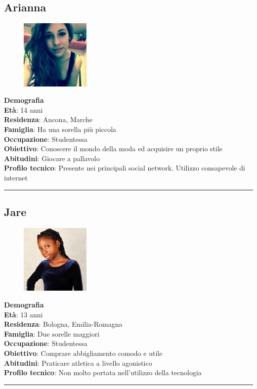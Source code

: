 \documentclass[12pt,a4paper]{report}
\begin{document}
\subsection*{Arianna}
\begin{figure}
  \centering
  \includegraphics[width=0.3\textwidth]{"Images Latex/Personas/Arianna"}
\end{figure}
\textbf{Demografia}\\
\indent\textbf{Età}: 14 anni\\
\indent\textbf{Residenza}: Ancona, Marche\\
\indent\textbf{Famiglia}: Ha una sorella più piccola\\
\indent\textbf{Occupazione}: Studentessa\\
\textbf{Obiettivo}: Conoscere il mondo della moda ed acquisire un proprio stile\\
\textbf{Abitudini}: Giocare a pallavolo\\
\textbf{Profilo tecnico}: Presente nei principali social network. Utilizzo consapevole di internet\\
\rule{\textwidth}{0.5pt}
\subsection*{Jare}
\begin{figure}
  \centering
    \includegraphics[width=0.3\textwidth]{"Images Latex/Personas/Jare"}
\end{figure}
\textbf{Demografia}\\
\indent \textbf{Età}: 13 anni\\
\indent \textbf{Residenza}: Bologna, Emilia-Romagna\\
\indent \textbf{Famiglia}: Due sorelle maggiori\\
\indent \textbf{Occupazione}: Studentessa\\
\textbf{Obiettivo}: Comprare abbigliamento comodo e utile\\
\textbf{Abitudini}: Praticare atletica a livello agonistico\\
\textbf{Profilo tecnico}: Non molto portata nell'utilizzo della tecnologia\\
\rule{\textwidth}{0.5pt}
\end{document}
